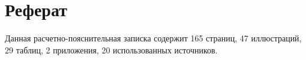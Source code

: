 \newpage
\section*{Реферат}
Данная расчетно-пояснительная записка содержит 165 страниц, 47 иллюстраций, 29 таблиц, 2 приложения, 20 использованных источников.


